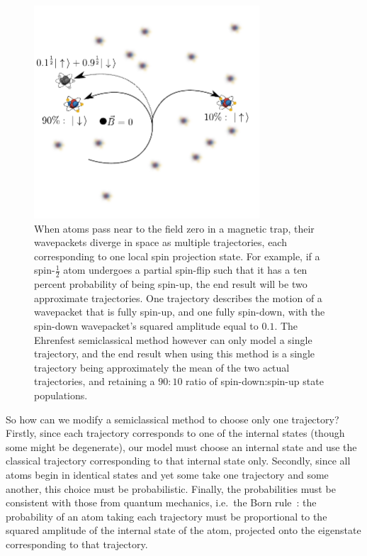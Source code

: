\begin{figure}[t]
    \centerfloat
    \includegraphics[width=0.75\textwidth]{figures/hidden_variables/evap_problem.pdf}
    \caption{When atoms pass near to the field zero in a magnetic trap, their wavepackets diverge in space as multiple trajectories, each corresponding to one local spin projection state. For example, if a spin-$\frac12$ atom undergoes a partial spin-flip such that it has a ten percent probability of being spin-up, the end result will be two approximate trajectories. One trajectory describes the motion of a wavepacket that is fully spin-up, and one fully spin-down, with the spin-down wavepacket's squared amplitude equal to $0.1$. The Ehrenfest semiclassical method however can only model a single trajectory, and the end result when using this method is a single trajectory being approximately the mean of the two actual trajectories, and retaining a $90:10$ ratio of spin-down:spin-up state populations.}
    \label{fig:evap_problem}
\end{figure}

So how can we modify a semiclassical method to choose only one trajectory? Firstly, since each trajectory corresponds to one of the internal states (though some might be degenerate), our model must choose an internal state and use the classical trajectory corresponding to that internal state only. Secondly, since all atoms begin in identical states and yet some take one trajectory and some another, this choice must be probabilistic. Finally, the probabilities must be consistent with those from quantum mechanics, i.e.~the Born rule~\cite{born_zur_1926}: the probability of an atom taking each trajectory must be proportional to the squared amplitude of the internal state of the atom, projected onto the eigenstate corresponding to that trajectory.

